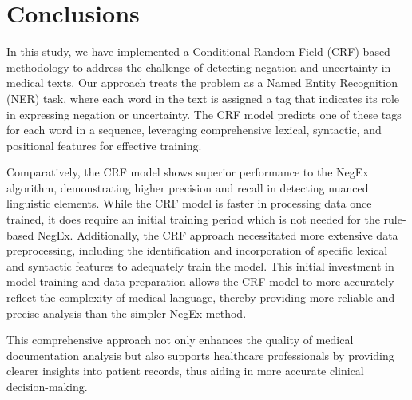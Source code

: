 \documentclass{article}
\begin{document}
\section*{Conclusions}
In this study, we have implemented a Conditional Random Field (CRF)-based methodology to address the challenge
of detecting negation and uncertainty in medical texts. Our approach treats the problem as a Named Entity
Recognition (NER) task, where each word in the text is assigned a tag that indicates its role in expressing
negation or uncertainty. The CRF model predicts one of these tags for each word in a sequence, leveraging
comprehensive lexical, syntactic, and positional features for effective training.

Comparatively, the CRF model shows superior performance to the NegEx algorithm, demonstrating higher precision
and recall in detecting nuanced linguistic elements. While the CRF model is faster in processing data once
trained, it does require an initial training period which is not needed for the rule-based NegEx. Additionally,
the CRF approach necessitated more extensive data preprocessing, including the identification and incorporation
of specific lexical and syntactic features to adequately train the model. This initial investment in model
training and data preparation allows the CRF model to more accurately reflect the complexity of medical language,
thereby providing more reliable and precise analysis than the simpler NegEx method.

This comprehensive approach not only enhances the quality of medical documentation analysis but also supports
healthcare professionals by providing clearer insights into patient records, thus aiding in more accurate
clinical decision-making.


\printbibliography
\end{document}
